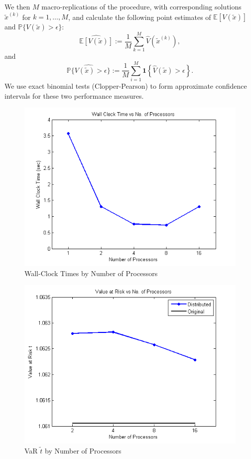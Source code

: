 \documentclass[12pt]{article}
\begin{document}
We then $M$ macro-replications of the procedure, with corresponding solutions $\tilde{x}^{(k)}$ for $k = 1, \ldots, M$, and calculate the following point estimates of $\mathbb{E}[V(\tilde{x})]$ and $\mathbb{P}\{V(\tilde{x}) > \epsilon\}$:
\[ \widehat{\mathbb{E}[V(\tilde{x})]} := \frac{1}{M} \sum_{k=1}^M \hat{V}(\tilde{x}^{(k)}), \]
and
\[ \widehat{\mathbb{P}\{V(\tilde{x}) > \epsilon\}} := \frac{1}{M} \sum_{i=1}^M \mathbf{1}\left\{\hat{V}(\tilde{x}) > \epsilon\right\}. \]
We use exact binomial tests (Clopper-Pearson) to form approximate confidence intervals for these two performance measures.

\begin{figure}[ht]
	\centering
		\includegraphics{../plot/figs/wct_numproc.png}
	\caption{Wall-Clock Times by Number of Processors}
	\label{fig:wct_numproc}
\end{figure}

\begin{figure}[ht]
	\centering
		\includegraphics{../plot/figs/objfnval_num_proc.png}
	\caption{VaR $\tilde{t}$ by Number of Processors}
	\label{fig:objfnval_num_proc}
\end{figure}
\end{document}
